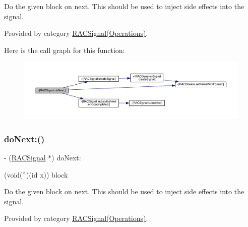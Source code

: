 Do the given block on {\ttfamily next}. This should be used to inject side effects into the signal. 

Provided by category \mbox{\hyperlink{category_r_a_c_signal_07_operations_08_a36028c2d987159f5210840358f4877c9}{R\+A\+C\+Signal(\+Operations)}}.

Here is the call graph for this function\+:\nopagebreak
\begin{figure}[H]
\begin{center}
\leavevmode
\includegraphics[width=350pt]{interface_r_a_c_signal_a36028c2d987159f5210840358f4877c9_cgraph}
\end{center}
\end{figure}
\mbox{\label{interface_r_a_c_signal_a36028c2d987159f5210840358f4877c9}} 
\subsubsection{\texorpdfstring{do\+Next\+:()}{doNext:()}\hspace{0.1cm}{\footnotesize\ttfamily [3/3]}}
{\footnotesize\ttfamily -\/ (\mbox{\hyperlink{interface_r_a_c_signal}{R\+A\+C\+Signal}} $\ast$) do\+Next\+: \begin{DoxyParamCaption}\item[{(void($^\wedge$)(id x))}]{block }\end{DoxyParamCaption}}

Do the given block on {\ttfamily next}. This should be used to inject side effects into the signal. 

Provided by category \mbox{\hyperlink{category_r_a_c_signal_07_operations_08_a36028c2d987159f5210840358f4877c9}{R\+A\+C\+Signal(\+Operations)}}.

\mbox{\label{interface_r_a_c_signal_a51f980781f2dc9e662278d7db7b0cd38}} 
